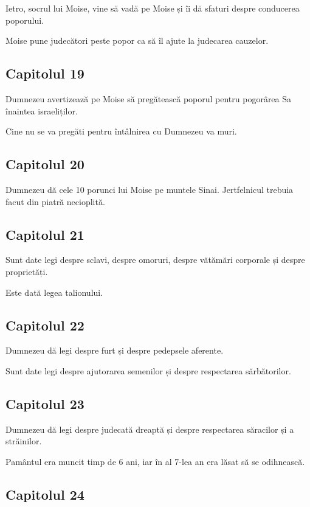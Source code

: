 \documentclass[12pt,a4paper]{article}
\begin{document}
Ietro, socrul lui Moise, vine să vadă pe Moise și îi dă sfaturi despre conducerea poporului.

Moise pune judecători peste popor ca să îl ajute la judecarea cauzelor.

\subsection{Capitolul 19}

Dumnezeu avertizează pe Moise să pregătească poporul pentru pogorârea Sa înaintea israeliților.

Cine nu se va pregăti pentru întâlnirea cu Dumnezeu va muri.

\subsection{Capitolul 20}

Dumnezeu dă cele 10 porunci lui Moise pe muntele Sinai.
Jertfelnicul trebuia facut din piatră necioplită.

\subsection{Capitolul 21}

Sunt date legi despre sclavi, despre omoruri, despre vătămări corporale și despre proprietăți.

Este dată legea talionului.

\subsection{Capitolul 22}

Dumnezeu dă legi despre furt și despre pedepsele aferente.

Sunt date legi despre ajutorarea semenilor și despre respectarea sărbătorilor.

\subsection{Capitolul 23}

Dumnezeu dă legi despre judecată dreaptă și despre respectarea săracilor și a străinilor.

Pamântul era muncit timp de 6 ani, iar în al 7-lea an era lăsat să se odihnească.

\subsection{Capitolul 24}
\end{document}
